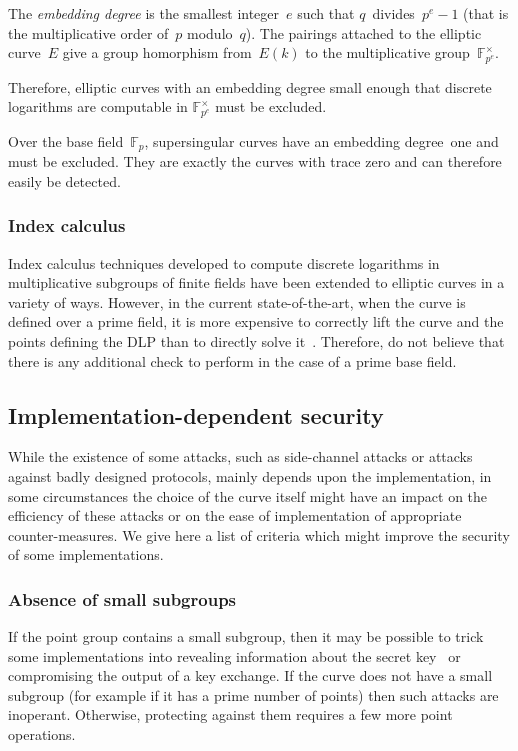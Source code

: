\documentclass[twocolumn,letterpaper,10pt]{article}
\def\F{\mathbb{F}}
\begin{document}
The \emph{embedding degree} is the smallest integer~$e$ such that
$q$~divides~$p^e -1$
(that is the multiplicative order of~$p$ modulo~$q$).
The pairings attached to the elliptic curve~$E$
give a group homorphism from~$E(k)$
to the multiplicative group~$\F_{p^e}^{×}$.

Therefore, elliptic curves with an embedding degree small enough
that discrete logarithms are computable in $\F_{p^e}^{×}$
must be excluded.

Over the base field~$\F_p$, supersingular curves
have an embedding degree~one and must be excluded.
They are exactly the curves with trace zero
and can therefore easily be detected.

\subsubsection{Index calculus}

Index calculus techniques developed to compute discrete logarithms
in multiplicative subgroups of finite fields
have been extended to elliptic curves in a variety of ways.
However, in the current state-of-the-art, when the curve is defined over
a prime field, it is more expensive
to correctly lift the curve and the points defining the DLP than
to directly solve it~\cite{asia1998ss,dcc2000silverman,dcc2000ksst,ecc2007silverman,sac2008silverman}.
Therefore, do not believe that there is any additional check to perform
in the case of a prime base field.

\subsection{Implementation-dependent security}
\label{ss:side}

While the existence of some attacks,
such as side-channel attacks or attacks against badly designed protocols,
mainly depends upon the implementation,
in some circumstances the choice of the curve itself
might have an impact on the efficiency of these attacks
or on the ease of implementation of appropriate counter-measures.
We give here a list of criteria
which might improve the security
of some implementations.

\subsubsection{Absence of small subgroups}
\label{sss:small-subgroup}

If the point group contains a small subgroup,
then it may be possible to trick some implementations
into revealing information about the secret key~\cite{crypto1997ll}
or compromising the output of a key exchange.
If the curve does not have a small subgroup
(for example if it has a prime number of points)
then such attacks are inoperant.
Otherwise, protecting against them requires a few more point operations.
\end{document}
